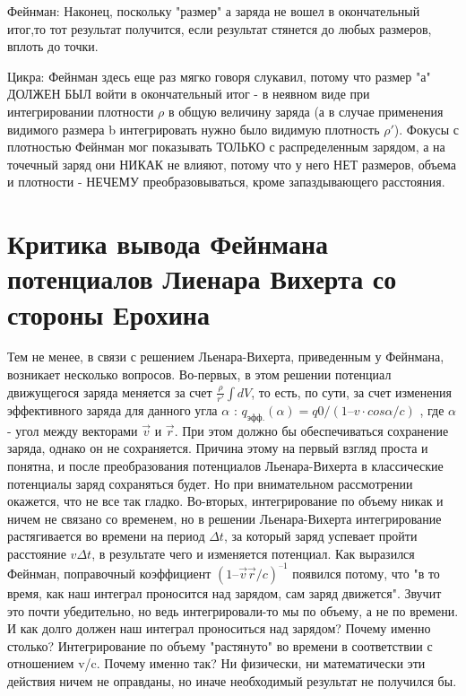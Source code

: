 \documentclass{article}
\begin{document}
Фейнман:
Наконец, поскольку "размер" а заряда не вошел в окончательный итог,то тот результат получится, если результат стянется до любых размеров, вплоть до точки.

Цикра:
Фейнман здесь еще раз мягко говоря слукавил, потому что размер "а" ДОЛЖЕН БЫЛ войти в окончательный итог - в неявном виде при интегрировании плотности $\rho$ в общую величину заряда (а в случае применения видимого размера b интегрировать нужно было видимую плотность $\rho'$).
Фокусы с плотностью Фейнман мог показывать ТОЛЬКО с распределенным зарядом, а на точечный заряд они НИКАК не влияют, потому что у него НЕТ размеров, объема и плотности - НЕЧЕМУ преобразовываться, кроме запаздывающего расстояния.

\section{Критика вывода Фейнмана потенциалов Лиенара Вихерта со стороны Ерохина \cite{erohin}}


Тем не менее, в связи с решением Льенара-Вихерта, приведенным у Фейнмана, возникает несколько вопросов.
Во-первых, в этом решении потенциал движущегося заряда меняется за счет $\frac{\rho}{r'}\int dV$, то есть, по сути, за счет изменения эффективного заряда для данного угла $\alpha$ :  $q_{эфф.}(\alpha) = q0 / (1 – v \cdot cos \alpha/c)$ ,  где $\alpha$ - угол между векторами $\vec v$ и $\vec r$.  При этом должно бы обеспечиваться сохранение заряда, однако он не сохраняется. Причина этому на первый взгляд проста и понятна, и после преобразования потенциалов Льенара-Вихерта в классические потенциалы заряд сохраняться будет.  Но при внимательном рассмотрении окажется, что не все так гладко. 
Во-вторых, интегрирование по объему никак и ничем не связано со временем, но в решении Льенара-Вихерта интегрирование растягивается во времени на период $\Delta t$, за который заряд успевает пройти расстояние $v \Delta t$, в результате чего и изменяется потенциал. 
Как выразился Фейнман, поправочный коэффициент $(1 – \vec v \vec r/c)^{–1}$ появился потому, что "в то время, как наш интеграл проносится над зарядом, сам заряд движется".  Звучит это почти убедительно, но ведь интегрировали-то мы по объему, а не по времени. И как долго должен наш интеграл проноситься над зарядом? Почему именно столько?  Интегрирование по объему "растянуто" во времени в соответствии с отношением v/c. Почему именно так? Ни физически, ни математически эти действия ничем не оправданы, но иначе необходимый результат не получился бы. 
\end{document}
